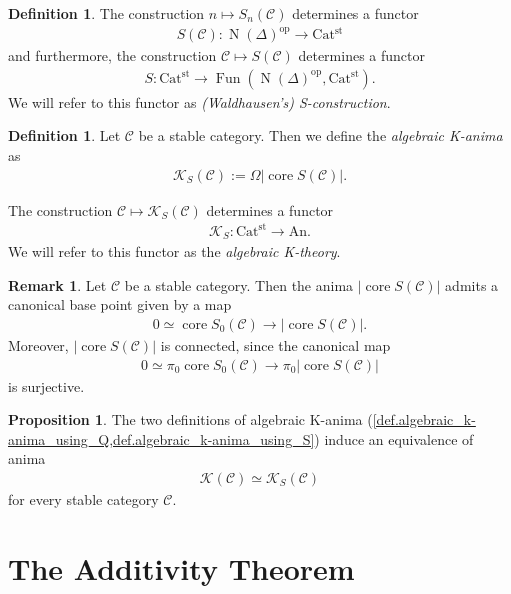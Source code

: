 \documentclass[a4paper,dvipdfmx,11pt,reqno]{amsart}
\DeclareMathOperator{\myop}{op}
\DeclareMathOperator{\N}{N}
\DeclareMathOperator{\Fun}{Fun}
\newcommand{\C}{\mathcal{C}}
\newcommand{\K}{\mathcal{K}}
\DeclareMathOperator{\core}{core}
\newcommand{\An}{\mathrm{An}}
\newcommand{\Catst}{\mathrm{Cat^{st}}}
\theoremstyle{definition}
\newtheorem{definition}[theorem]{Definition}
\newtheorem{proposition}[theorem]{Proposition}
\newtheorem{remark}[theorem]{Remark}
\begin{document}
\begin{definition}
  The construction $n \mapsto S_n(\C)$ determines a functor 
  \begin{align*}
    S(\C) : \N(\Delta)^{\myop} \to \Catst
  \end{align*}
  and furthermore, the construction $\C \mapsto S(\C)$ determines a functor 
  \begin{align*}
    S : \Catst \to \Fun(\N(\Delta)^{\myop},\Catst).
  \end{align*}
  We will refer to this functor as \textit{(Waldhausen's) S-construction}.
\end{definition}

\begin{definition} \label{def.algebraic_k-anima_using_S}
  Let $\C$ be a stable category.
  Then we define the \textit{algebraic K-anima} as 
  \begin{align*}
    \K_S(\C) := \Omega|\core S(\C)|.
  \end{align*}

  The construction $\C \mapsto \K_S(\C)$ determines a functor 
  \begin{align*}
    \K_S : \Catst \to \An.
  \end{align*}
  We will refer to this functor as the \textit{algebraic K-theory}.
\end{definition}
 
\begin{remark} %
  Let $\C$ be a stable category.
  Then the anima $|\core S(\C)|$ admits a canonical base point given by a map 
  \begin{align*}
    0 \simeq \core S_0(\C) \to |\core S(\C)|.
  \end{align*}
  Moreover, $|\core S(\C)|$ is connected, since the canonical map 
  \begin{align*}
    0 \simeq \pi_0 \core S_0(\C) \to \pi_0 |\core S(\C)|
  \end{align*}
  is surjective.
\end{remark}

\begin{proposition}
  The two definitions of algebraic K-anima (\cref{def.algebraic_k-anima_using_Q,def.algebraic_k-anima_using_S}) induce an equivalence of anima
  \begin{align*}
    \K(\C) \simeq \K_S(\C)
  \end{align*}
  for every stable category $\C$.
\end{proposition}


\section{The Additivity Theorem}
\end{document}
